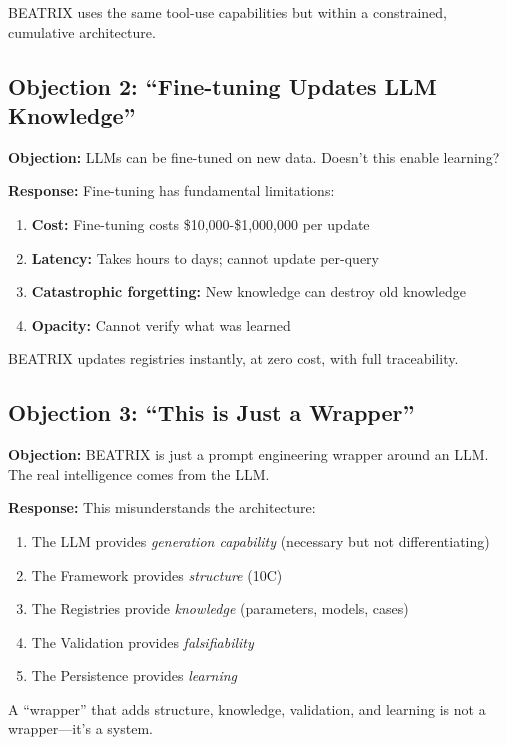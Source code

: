 BEATRIX uses the same tool-use capabilities but within a constrained, cumulative architecture.

\subsection{Objection 2: ``Fine-tuning Updates LLM Knowledge''}

\textbf{Objection:} LLMs can be fine-tuned on new data. Doesn't this enable learning?

\textbf{Response:} Fine-tuning has fundamental limitations:
\begin{enumerate}
    \item \textbf{Cost:} Fine-tuning costs \$10,000-\$1,000,000 per update
    \item \textbf{Latency:} Takes hours to days; cannot update per-query
    \item \textbf{Catastrophic forgetting:} New knowledge can destroy old knowledge
    \item \textbf{Opacity:} Cannot verify what was learned
\end{enumerate}

BEATRIX updates registries instantly, at zero cost, with full traceability.

\subsection{Objection 3: ``This is Just a Wrapper''}

\textbf{Objection:} BEATRIX is just a prompt engineering wrapper around an LLM. The real intelligence comes from the LLM.

\textbf{Response:} This misunderstands the architecture:
\begin{enumerate}
    \item The LLM provides \textit{generation capability} (necessary but not differentiating)
    \item The Framework provides \textit{structure} (10C)
    \item The Registries provide \textit{knowledge} (parameters, models, cases)
    \item The Validation provides \textit{falsifiability}
    \item The Persistence provides \textit{learning}
\end{enumerate}

A ``wrapper'' that adds structure, knowledge, validation, and learning is not a wrapper---it's a system.


